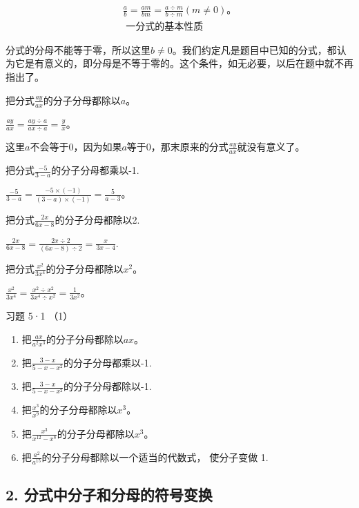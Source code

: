 \[
\boxed { \begin{array}{l} \frac{a}{b} = \frac{a m}{b m} = \frac{a \div m}{b \div m} (m \neq 0)\text{。} \\ \text{ 一分式的基本性质 } \end{array} }
\]

分式的分母不能等于零，所以这里\(b \neq 0\)。我们约定凡是题目中已知的分式，都认为它是有意义的，即分母是不等于零的。这个条件，如无必要，以后在题中就不再指出了。

 把分式\(\frac{ay}{ax}\)的分子分母都除以\(a\)。

\(\frac{ay}{ax} = \frac{ay \div a}{ax \div a} = \frac{y}{x}\)。

这里\(a\)不会等于0，因为如果\(a\)等于0，那末原来的分式\(\frac{ay}{ax}\)就没有意义了。

 把分式\(\frac{-5}{3 - a}\)的分子分母都乘以-1.

\(\frac{-5}{3 - a} = \frac{-5 \times (-1)}{(3 - a) \times (-1)} = \frac{5}{a - 3}\)。

 把分式\(\frac{2x}{6x - 8}\)的分子分母都除以2.

\(\frac{2x}{6x - 8} = \frac{2x\div 2}{(6x - 8)\div 2} = \frac{x}{3x - 4}.\)

 把分式\(\frac{x^2}{3x^4}\)的分子分母都除以\(x^2\)。

\(\frac{x^2}{3x^4} = \frac{x^2 \div x^2}{3x^4 \div x^2} = \frac{1}{3x^2}\)。

习题 5·1 （1）

\begin{enumerate}
\item
  把\(\frac{ax}{a^2x^3}\)的分子分母都除以\(ax\)。
\item
  把\(\frac{3 - x}{5 - x - x^2}\)的分子分母都乘以-1.
\item
  把\(\frac{3 - x}{5 - x - x^2}\)的分子分母都除以-1.
\item
  把\(\frac{x^3}{x^9}\)的分子分母都除以\(x^3\)。
\item
  把\(\frac{x^3}{x^{12} - x^8}\)的分子分母都除以\(x^3\)。
\item
  把\(\frac{a^2}{a^{15}}\)的分子分母都除以一个适当的代数式， 使分子变做
  1.
\end{enumerate}

\subsection{2. 分式中分子和分母的符号变换}


